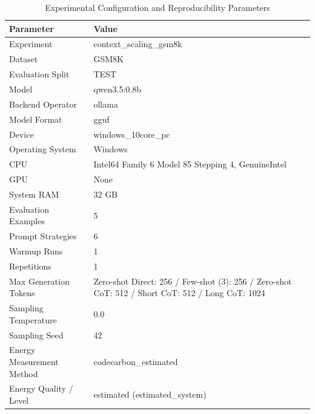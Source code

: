 \begin{table}
\caption{Experimental Configuration and Reproducibility Parameters}
\label{tab:experimental_configuration}
\begin{tabular}{ll}
\toprule
Parameter & Value \\
\midrule
Experiment & context\_scaling\_gsm8k \\
Dataset & GSM8K \\
Evaluation Split & TEST \\
Model & qwen3.5:0.8b \\
Backend Operator & ollama \\
Model Format & gguf \\
Device & windows\_10core\_pc \\
Operating System & Windows \\
CPU & Intel64 Family 6 Model 85 Stepping 4, GenuineIntel \\
GPU & None \\
System RAM & 32 GB \\
Evaluation Examples & 5 \\
Prompt Strategies & 6 \\
Warmup Runs & 1 \\
Repetitions & 1 \\
Max Generation Tokens & Zero-shot Direct: 256 / Few-shot (3): 256 / Zero-shot CoT: 512 / Short CoT: 512 / Long CoT: 1024 \\
Sampling Temperature & 0.0 \\
Sampling Seed & 42 \\
Energy Measurement Method & codecarbon\_estimated \\
Energy Quality / Level & estimated (estimated\_system) \\
\bottomrule
\end{tabular}
\end{table}
